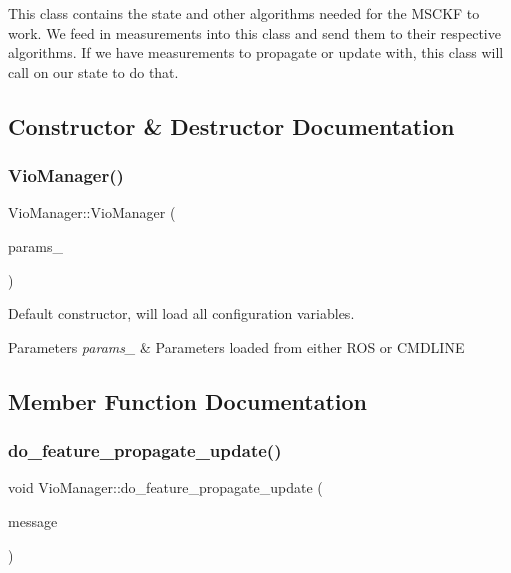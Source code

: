 This class contains the state and other algorithms needed for the M\+S\+C\+KF to work. We feed in measurements into this class and send them to their respective algorithms. If we have measurements to propagate or update with, this class will call on our state to do that. 

\subsection{Constructor \& Destructor Documentation}
\mbox{\label{classov__msckf_1_1VioManager_aa2376a11794739f8d7811d6e7c0dd447}} 
\subsubsection{\texorpdfstring{Vio\+Manager()}{VioManager()}}
{\footnotesize\ttfamily Vio\+Manager\+::\+Vio\+Manager (\begin{DoxyParamCaption}\item[{\hyperlink{structov__msckf_1_1VioManagerOptions}{Vio\+Manager\+Options} \&}]{params\+\_\+ }\end{DoxyParamCaption})}



Default constructor, will load all configuration variables. 


\begin{DoxyParams}{Parameters}
{\em params\+\_\+} & Parameters loaded from either R\+OS or C\+M\+D\+L\+I\+NE \\
\hline
\end{DoxyParams}


\subsection{Member Function Documentation}
\mbox{\label{classov__msckf_1_1VioManager_a31d3fade828a229a1b5a99abd9aaa243}} 
\subsubsection{\texorpdfstring{do\+\_\+feature\+\_\+propagate\+\_\+update()}{do\_feature\_propagate\_update()}}
{\footnotesize\ttfamily void Vio\+Manager\+::do\+\_\+feature\+\_\+propagate\+\_\+update (\begin{DoxyParamCaption}\item[{const \hyperlink{structov__core_1_1CameraData}{ov\+\_\+core\+::\+Camera\+Data} \&}]{message }\end{DoxyParamCaption})\hspace{0.3cm}{\ttfamily [protected]}}



